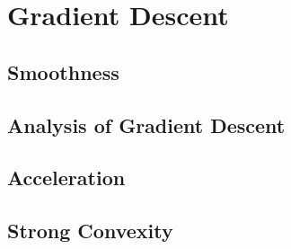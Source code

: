 
\chapter{Gradient Descent}

\section{Smoothness}
\section{Analysis of Gradient Descent}
\section{Acceleration}
\section{Strong Convexity}